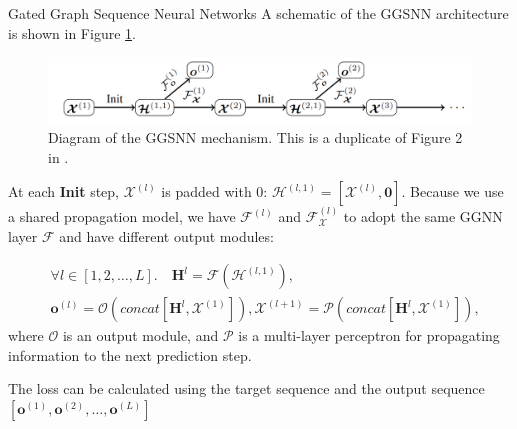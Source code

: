 \documentclass[final,hyperref={pdfpagelabels=false}]{beamer}
\begin{document}
\begin{frame}[t]
\begin{columns}[t]
\begin{column}{.3\textwidth}
\begin{block}{Gated Graph Sequence Neural Networks}
    A schematic of the GGSNN architecture is shown in Figure \ref{fig:GGSNN}.
    \begin{figure}
        \centering
        \includegraphics[width=\textwidth]{imgs/ggsnn.png}
        \caption{Diagram of the GGSNN mechanism. This is a duplicate of Figure 2 in \cite{DBLP:journals/corr/LiTBZ15}.}
        \label{fig:GGSNN}
    \end{figure}
    At each \textbf{Init} step, $\boldsymbol{\mathcal{X}}^{(l)}$ is padded with 0: $\boldsymbol{\mathcal{H}}^{(l, 1)} = [\boldsymbol{\mathcal{X}}^{(l)}, \boldsymbol{0}]$.
    Because we use a shared propagation model, we have $\mathcal{F}_{}^{(l)}$ and $\mathcal{F}_{\boldsymbol{\mathcal{X}}}^{(l)}$ to adopt the same GGNN layer $\mathcal{F}$ and have different output modules:
    
    \begin{equation}
    \begin{aligned}
        & \forall l \in [1, 2, \ldots, L].\quad \boldsymbol{H}^l = \boldsymbol{\mathcal{F}}\left(\boldsymbol{\mathcal{H}}^{(l, 1)}\right),\\
        & \boldsymbol{o}^{(l)} = 
        \boldsymbol{\mathcal{O}} \left(concat[\boldsymbol{H}^l, \boldsymbol{\mathcal{X}}^{(1)}]\right),
        \boldsymbol{\mathcal{X}}^{(l+1)} = \boldsymbol{\mathcal{P}}\left(concat[\boldsymbol{H}^l, \boldsymbol{\mathcal{X}}^{(1)}]\right),
    \end{aligned}
    \end{equation}
    where $\boldsymbol{\mathcal{O}}$ is an output module, and $\boldsymbol{\mathcal{P}}$ is a multi-layer perceptron for propagating information to the next prediction step.
    \vspace{0.2in}
    
    The loss can be calculated using the target sequence and the output sequence $[\boldsymbol{o}^{(1)}, \boldsymbol{o}^{(2)}, \ldots, \boldsymbol{o}^{(L)}]$
    
    \end{block}
    
    
    

  \end{column} %



\end{columns}
\end{frame}
\end{document}

